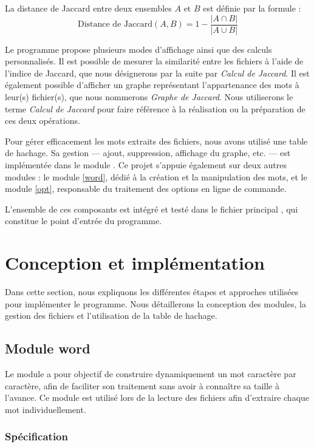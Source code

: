 \documentclass[a4paper, 12pt]{article}
\newcommand{\code}{\commandbox}
\begin{document}
La distance de Jaccard entre deux ensembles $A$ et $B$ est définie par la formule :
$$
\text{Distance de Jaccard}(A, B) = 1 - \frac{|A \cap B|}{|A \cup B|}
$$

Le programme propose plusieurs modes d'affichage ainsi que des calculs personnalisés.  
Il est possible de mesurer la similarité entre les fichiers à l’aide de l’indice de Jaccard, que nous désignerons par la suite par \textit{Calcul de Jaccard}.  
Il est également possible d’afficher un graphe représentant l’appartenance des mots à leur(s) fichier(s), que nous nommerons \textit{Graphe de Jaccard}.  
Nous utiliserons le terme \textit{Calcul de Jaccard} pour faire référence à la réalisation ou la préparation de ces deux opérations.

Pour gérer efficacement les mots extraits des fichiers, nous avons utilisé une table de hachage. Sa gestion — ajout, suppression, affichage du graphe, etc. — est implémentée dans le module \code{jaccard}. Ce projet s’appuie également sur deux autres modules : le module \code{word} \autoref{word}, dédié à la création et la manipulation des mots, et le module \code{opt} \autoref{opt}, responsable du traitement des options en ligne de commande.

L’ensemble de ces composants est intégré et testé dans le fichier principal \code{main.c}, qui constitue le point d’entrée du programme.


\section{Conception et implémentation}

Dans cette section, nous expliquons les différentes étapes et approches utilisées pour implémenter le programme. Nous détaillerons la conception des modules, la gestion des fichiers et l’utilisation de la table de hachage.

\subsection{Module word}

\label{word}

Le module \code{word} a pour objectif de construire dynamiquement un mot caractère par caractère, afin de faciliter son traitement sans avoir à connaître sa taille à l’avance. Ce module est utilisé lors de la lecture des fichiers afin d'extraire chaque mot individuellement.

\subsubsection{Spécification}
\end{document}
